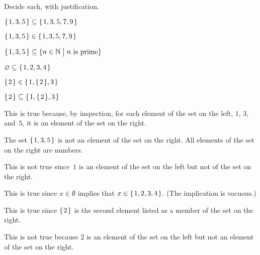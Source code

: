 \documentclass{ibl}  %
\begin{document}
\begin{problem} Decide each, with justification.
\begin{items}
\item $\mbox{$\{\hspace{0.1em}1,3,5\hspace{0.1em}\}$}\subseteq\mbox{$\{\hspace{0.1em}1,3, 5, 7, 9\hspace{0.1em}\}$}$
\item $\mbox{$\{\hspace{0.1em}1, 3, 5\hspace{0.1em}\}$}\in\mbox{$\{\hspace{0.1em}1, 3, 5, 7, 9\hspace{0.1em}\}$}$   
\item $\mbox{$\{\hspace{0.1em}1,3,5\hspace{0.1em}\}$}\subseteq\{n\in\mathbb{N} \bigm| \text{$n$ is prime}\}$
\item $\varnothing\subseteq\mbox{$\{\hspace{0.1em}1, 2, 3, 4\hspace{0.1em}\}$}$
\item $\mbox{$\{\hspace{0.1em}2\hspace{0.1em}\}$}\in\mbox{$\{\hspace{0.1em}1, \mbox{$\{\hspace{0.1em}2\hspace{0.1em}\}$}, 3\hspace{0.1em}\}$}$
\item $\mbox{$\{\hspace{0.1em}2\hspace{0.1em}\}$}\subseteq\mbox{$\{\hspace{0.1em}1, \mbox{$\{\hspace{0.1em}2\hspace{0.1em}\}$}, 3\hspace{0.1em}\}$}$
\end{items}
\begin{answer}
\begin{items}
\item This is true because, by inspection, for each element of the set
  on the left, $1$, $3$, and~$5$, it is an element of the set on the right.
\item The set $\mbox{$\{\hspace{0.1em}1,3,5\hspace{0.1em}\}$}$ is not an element of the set on the right.
  All elements of the set on the right are numbers.
\item This is not true since~$1$ is an element of the set on the left
  but not of the set on the right.
\item This is true since $x\in\emptyset$ implies that $x\in\mbox{$\{\hspace{0.1em}1, 2, 3, 4\hspace{0.1em}\}$}$. 
  (The implication is vacuous.)
\item This is true since $\mbox{$\{\hspace{0.1em}2\hspace{0.1em}\}$}$ is the second element listed as a
  member of the set on the right.
\item This is not true because $2$ is an element of the set on the left but
  not an element of the set on the right.
\end{items}
\end{answer}
\end{problem}
\end{document}
